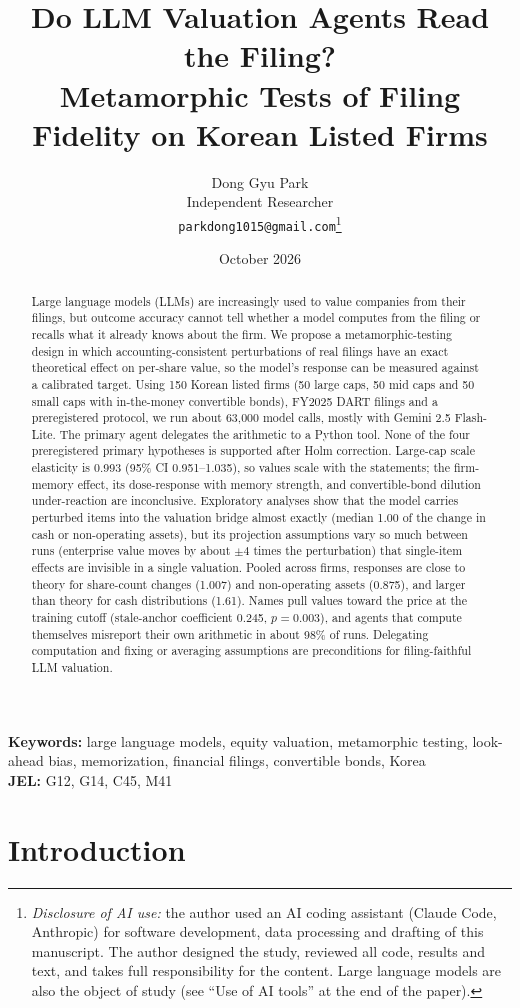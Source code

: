 \documentclass[11pt]{article}
\title{Do LLM Valuation Agents Read the Filing?\\[2pt]
\large Metamorphic Tests of Filing Fidelity on Korean Listed Firms}
\author{Dong Gyu Park\\
Independent Researcher\\
\texttt{parkdong1015@gmail.com}\thanks{\textit{Disclosure of AI use:} the author used an AI coding assistant (Claude Code, Anthropic) for software development, data processing and drafting of this manuscript. The author designed the study, reviewed all code, results and text, and takes full responsibility for the content. Large language models are also the object of study (see ``Use of AI tools'' at the end of the paper).}}
\date{October 2026}
\begin{document}
\maketitle

\begin{abstract}
Large language models (LLMs) are increasingly used to value companies from their filings, but outcome accuracy cannot tell whether a model computes from the filing or recalls what it already knows about the firm. We propose a metamorphic-testing design in which accounting-consistent perturbations of real filings have an exact theoretical effect on per-share value, so the model's response can be measured against a calibrated target. Using 150 Korean listed firms (50 large caps, 50 mid caps and 50 small caps with in-the-money convertible bonds), FY2025 DART filings and a preregistered protocol, we run about 63{,}000 model calls, mostly with Gemini 2.5 Flash-Lite. The primary agent delegates the arithmetic to a Python tool. None of the four preregistered primary hypotheses is supported after Holm correction. Large-cap scale elasticity is 0.993 (95\% CI 0.951--1.035), so values scale with the statements; the firm-memory effect, its dose-response with memory strength, and convertible-bond dilution under-reaction are inconclusive. Exploratory analyses show that the model carries perturbed items into the valuation bridge almost exactly (median 1.00 of the change in cash or non-operating assets), but its projection assumptions vary so much between runs (enterprise value moves by about $\pm4$ times the perturbation) that single-item effects are invisible in a single valuation. Pooled across firms, responses are close to theory for share-count changes (1.007) and non-operating assets (0.875), and larger than theory for cash distributions (1.61). Names pull values toward the price at the training cutoff (stale-anchor coefficient 0.245, $p=0.003$), and agents that compute themselves misreport their own arithmetic in about 98\% of runs. Delegating computation and fixing or averaging assumptions are preconditions for filing-faithful LLM valuation.
\end{abstract}

\noindent\textbf{Keywords:} large language models, equity valuation, metamorphic testing, look-ahead bias, memorization, financial filings, convertible bonds, Korea\\
\textbf{JEL:} G12, G14, C45, M41

\section{Introduction}
\end{document}
